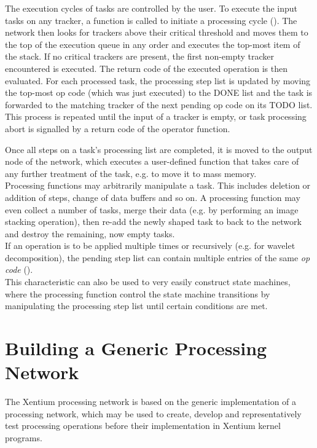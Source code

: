 The execution cycles of tasks are controlled by the user. To execute the input
tasks on any tracker, a function is called to initiate a processing cycle
(). The network then looks for trackers above their
critical threshold and moves them to the top of the execution queue in any
order and executes the top-most item of the stack. If no critical trackers are
present, the first non-empty tracker encountered is executed. The return code
of the executed operation is then evaluated.  For each processed task, the
processing step list is updated by moving the top-most op code (which was just
executed) to the DONE list and the task is forwarded to the matching
tracker of the next pending op code on its TODO list. This process is
repeated until the input of a tracker is empty, or task processing abort is
signalled by a return code of the operator function.

Once all steps on a task's processing list are completed, it is moved to the
output node of the network, which executes a user-defined function that takes
care of any further treatment of the task, e.g. to move it to mass memory.
\\

Processing functions may arbitrarily manipulate a task. This includes deletion
or addition of steps, change of data buffers and so on. A processing function
may even collect a number of tasks, merge their data (e.g. by performing an
image stacking operation), then re-add the newly shaped task to back to the
network and destroy the remaining, now empty tasks.
\\

If an operation is to be applied multiple times or recursively (e.g. for
wavelet decomposition), the pending step list can contain multiple entries of
the same \emph{op code} ().
\\

This characteristic can also be used to very easily construct state machines,
where the processing function control the state machine transitions by
manipulating the processing step list until certain conditions are met.



\section{Building a Generic Processing Network}

The Xentium processing network is based on the generic implementation of a
processing network, which may be used to create, develop and representatively
test processing operations before their implementation in Xentium kernel
programs.
\\

